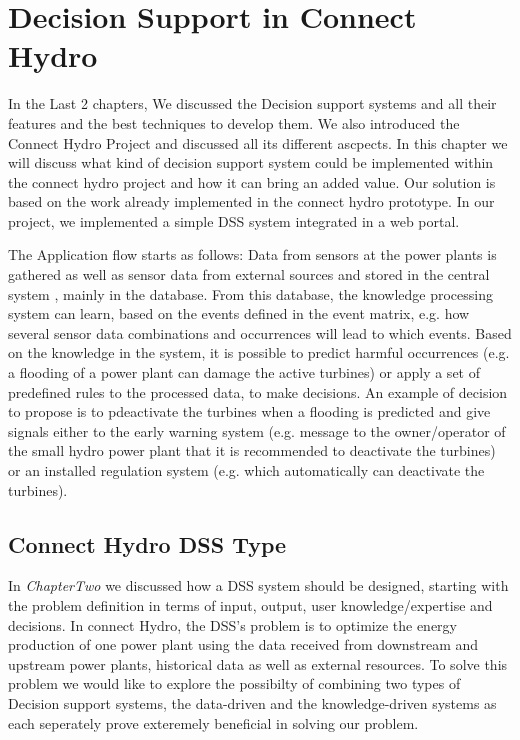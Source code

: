 \chapter{Decision Support in Connect Hydro}
\label{ChapterFour}
In the Last 2 chapters, We discussed the Decision support systems and all their features and the best techniques to develop them. We also introduced the Connect Hydro Project and discussed all its different ascpects. In this chapter we will discuss what kind of decision support system could be implemented within the connect hydro project and how it can bring an added value. Our solution is based on the work already implemented in the connect hydro prototype. In our project, we implemented a simple DSS system integrated in a web portal.

The Application flow starts as follows: Data from sensors at the power plants is gathered as well as sensor data from external sources and stored in the central system , mainly in the database. From this database, the knowledge processing system can learn, based on the events defined in the event matrix, e.g. how several sensor data combinations and occurrences will lead to which events. Based on the knowledge in the system, it is possible to predict harmful occurrences (e.g. a flooding of a power plant can damage the active turbines) or apply a set of predefined rules to the processed data, to make decisions. An example of decision to propose is to pdeactivate the turbines when a flooding is predicted and give signals either to the early warning system (e.g. message to the owner/operator of the small hydro power plant that it is recommended to deactivate the turbines) or an installed regulation system (e.g. which automatically can deactivate the turbines).\cite{SEIT2017}

\section{Connect Hydro DSS Type}
In \textit{ChapterTwo} we discussed how a DSS system should be designed, starting with the problem definition in terms of input, output, user knowledge/expertise and decisions. In connect Hydro, the DSS's problem is to optimize the energy production of one power plant using the data received from downstream and upstream power plants, historical data as well as external resources. To solve this problem we would like to explore the possibilty of combining two types of Decision support systems, the data-driven and the knowledge-driven systems as each seperately prove exteremely beneficial in solving our problem.

